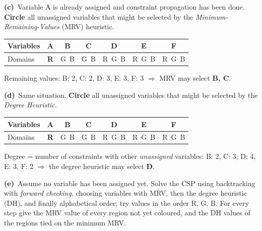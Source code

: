 \documentclass[11pt,a4paper]{article}
\newcommand{\subq}[1]{\par\smallskip\noindent\textbf{#1}\ }
\begin{document}
\subq{(c)}Variable A is already assigned and constraint propagation has been done. \textbf{Circle} all unassigned variables that might be selected by the \emph{Minimum-Remaining-Values} (MRV) heuristic.\begin{center}\small\begin{tabular}{|l|c|c|c|c|c|c|}\hline Variables & \textbf{A} & \textbf{B} & \textbf{C} & \textbf{D} & \textbf{E} & \textbf{F}\\ \hline Domains & \textbf{R} & G\ B & G\ B & R\ G\ B & R\ G\ B & R\ G\ B\\ \hline\end{tabular}\end{center}
\begin{solbox}
Remaining values: B: 2, C: 2, D: 3, E: 3, F: 3 $\Rightarrow$ MRV may select \textbf{B, C}.
\end{solbox}
\subq{(d)}Same situation. \textbf{Circle} all unassigned variables that might be selected by the \emph{Degree Heuristic}.\begin{center}\small\begin{tabular}{|l|c|c|c|c|c|c|}\hline Variables & \textbf{A} & \textbf{B} & \textbf{C} & \textbf{D} & \textbf{E} & \textbf{F}\\ \hline Domains & \textbf{R} & G\ B & G\ B & R\ G\ B & R\ G\ B & R\ G\ B\\ \hline\end{tabular}\end{center}
\begin{solbox}
Degree = number of constraints with other \emph{unassigned} variables: B: 2, C: 3, D: 4, E: 3, F: 2 $\Rightarrow$ the degree heuristic may select \textbf{D}.
\end{solbox}
\subq{(e)}Assume no variable has been assigned yet. Solve the CSP using backtracking with \emph{forward checking}, choosing variables with MRV, then the degree heuristic (DH), and finally alphabetical order; try values in the order R, G, B. For every step give the MRV value of every region not yet coloured, and the DH values of the regions tied on the minimum MRV.
\end{document}
